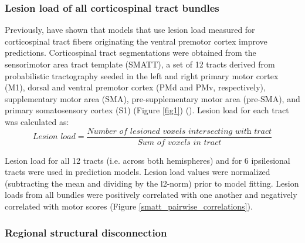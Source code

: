 \documentclass[10pt]{article}
\begin{document}
\subsubsection{Lesion load of all corticospinal tract bundles}
Previously, \cite{Ito2022-em} have shown that models that use lesion load measured for corticospinal tract fibers originating the ventral premotor cortex improve predictions.
Corticospinal tract segmentations were obtained from the sensorimotor area tract template (SMATT), a set of 12 tracts derived from probabilistic tractography seeded in the left and right primary motor cortex (M1), dorsal and ventral premotor cortex (PMd and PMv, respectively), supplementary motor area (SMA), pre-supplementary motor area (pre-SMA), and primary somatosensory cortex (S1) (Figure \ref{fig1}) (\cite{Archer2018-ti}). 
Lesion load for each tract was calculated as:
\begin{equation}
    \textit{Lesion load} = \frac{\textit{Number of lesioned voxels intersecting with  tract}}{\textit{Sum of voxels in tract}}
\end{equation}

Lesion load for all 12 tracts (i.e. across both hemispheres) and for 6 ipsilesional tracts were used in prediction models. Lesion load values were normalized (subtracting the mean and dividing by the l2-norm) prior to model fitting. Lesion loads from all bundles were positively correlated with one another and negatively correlated with motor scores (Figure \ref{smatt_pairwise_correlations}).

\subsubsection{Regional structural disconnection}
\end{document}
